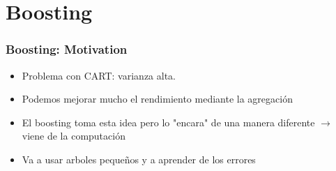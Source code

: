 \documentclass[
  shownotes,
  xcolor={svgnames},
  hyperref={colorlinks,citecolor=DarkBlue,linkcolor=andesred,urlcolor=DarkBlue}
  , aspectratio=169]{beamer}
\begin{document}
\section{Boosting}
\begin{frame}[fragile]
\frametitle{Boosting: Motivation}

\begin{itemize}
  \item Problema con CART: varianza alta.
  \medskip
   \item Podemos mejorar mucho el rendimiento mediante la agregación 
   \medskip 
   \item El boosting toma esta idea pero lo "encara" de una manera diferente $\rightarrow$ viene de la computación
   \medskip
   \item Va a usar arboles pequeños y a aprender de los errores


\end{itemize}
\end{frame}
\end{document}
